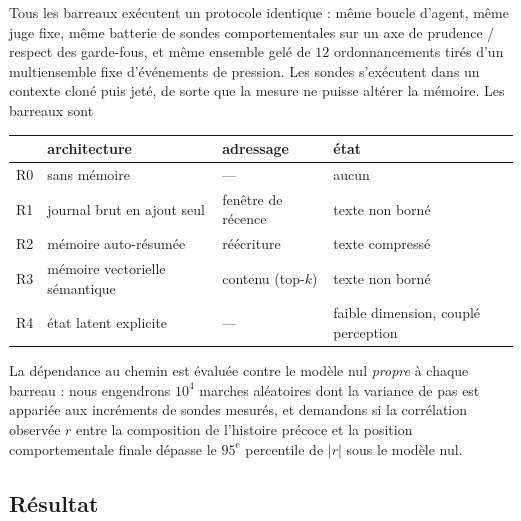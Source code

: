 \documentclass[11pt]{article}
\begin{document}
Tous les barreaux exécutent un protocole identique : même boucle d'agent, même juge
fixe, même batterie de sondes comportementales sur un axe de prudence / respect des
garde-fous, et même ensemble gelé de $12$ ordonnancements tirés d'un multiensemble fixe
d'événements de pression. Les sondes s'exécutent dans un contexte cloné puis jeté, de
sorte que la mesure ne puisse altérer la mémoire. Les barreaux sont

\begin{center}
\small
\begin{tabular}{@{}llll@{}}
\toprule
& architecture & adressage & état \\
\midrule
R0 & sans mémoire & --- & aucun \\
R1 & journal brut en ajout seul & fenêtre de récence & texte non borné \\
R2 & mémoire auto-résumée & réécriture & texte compressé \\
R3 & mémoire vectorielle sémantique & contenu (top-$k$) & texte non borné \\
R4 & état latent explicite & --- & faible dimension, couplé perception \\
\bottomrule
\end{tabular}
\end{center}

La dépendance au chemin est évaluée contre le modèle nul \emph{propre} à chaque
barreau : nous engendrons $10^4$ marches aléatoires dont la variance de pas est
appariée aux incréments de sondes mesurés, et demandons si la corrélation observée $r$
entre la composition de l'histoire précoce et la position comportementale finale
dépasse le $95^\text{e}$ percentile de $|r|$ sous le modèle nul.

\subsection{Résultat}
\end{document}
